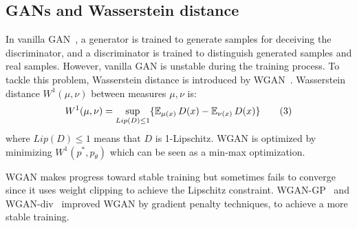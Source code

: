 \subsection{GANs and Wasserstein distance}

In vanilla GAN~\cite{goodfellow2014generative}, a generator is trained to generate samples for deceiving the discriminator, and a discriminator is trained to distinguish generated samples and real samples. However, vanilla GAN is unstable during the training process. To tackle this problem, Wasserstein distance is introduced by WGAN~\cite{arjovsky2017wasserstein}. Wasserstein distance $W^1(\mu, \nu)$ between measures $\mu, \nu$ is:
\begin{align*} \label{eq:Wasserstein-distance}
W^1(\mu, \nu) = \sup_{Lip(D) \leq 1} \{\operatorname{\mathbb{E}}_{\mu(x)} D(x)  - \operatorname{\mathbb{E}}_{\nu(x)} D(x)\} \tag{3}
\end{align*}
where $Lip(D) \leq 1$ means that $D$ is 1-Lipschitz. WGAN is optimized by minimizing $W^1(p^*, p_\theta)$ which can be seen as a min-max optimization. 

WGAN makes progress toward stable training but sometimes fails to converge since it uses weight clipping to achieve the Lipschitz constraint. WGAN-GP~\cite{gulrajani2017improved} and WGAN-div~\cite{wu2018wasserstein} improved WGAN by gradient penalty techniques, to achieve a more stable training.